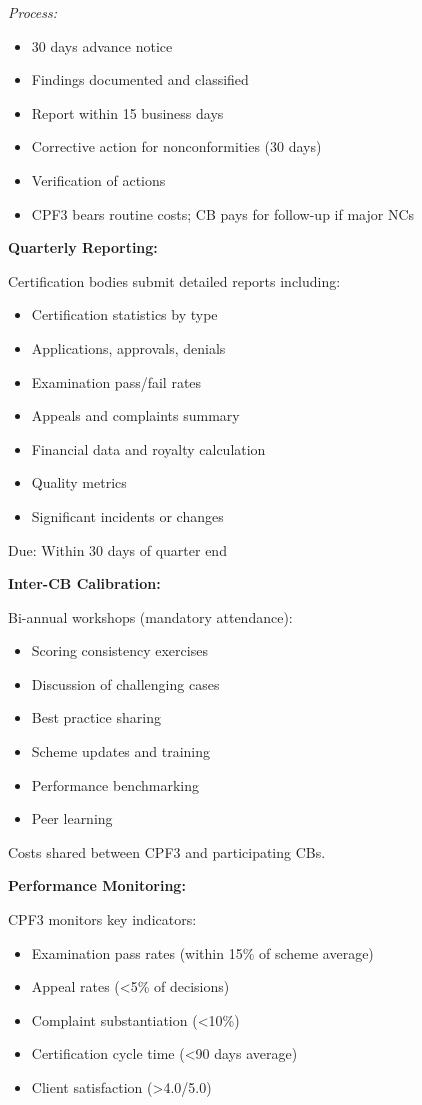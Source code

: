 \documentclass[11pt,a4paper]{article}
\begin{document}
\textit{Process:}
\begin{itemize}
\item 30 days advance notice
\item Findings documented and classified
\item Report within 15 business days
\item Corrective action for nonconformities (30 days)
\item Verification of actions
\item CPF3 bears routine costs; CB pays for follow-up if major NCs
\end{itemize}

\textbf{Quarterly Reporting:}

Certification bodies submit detailed reports including:

\begin{itemize}
\item Certification statistics by type
\item Applications, approvals, denials
\item Examination pass/fail rates
\item Appeals and complaints summary
\item Financial data and royalty calculation
\item Quality metrics
\item Significant incidents or changes
\end{itemize}

Due: Within 30 days of quarter end

\textbf{Inter-CB Calibration:}

Bi-annual workshops (mandatory attendance):

\begin{itemize}
\item Scoring consistency exercises
\item Discussion of challenging cases
\item Best practice sharing
\item Scheme updates and training
\item Performance benchmarking
\item Peer learning
\end{itemize}

Costs shared between CPF3 and participating CBs.

\textbf{Performance Monitoring:}

CPF3 monitors key indicators:

\begin{itemize}
\item Examination pass rates (within 15\% of scheme average)
\item Appeal rates (<5\% of decisions)
\item Complaint substantiation (<10\%)
\item Certification cycle time (<90 days average)
\item Client satisfaction (>4.0/5.0)
\end{itemize}
\end{document}
